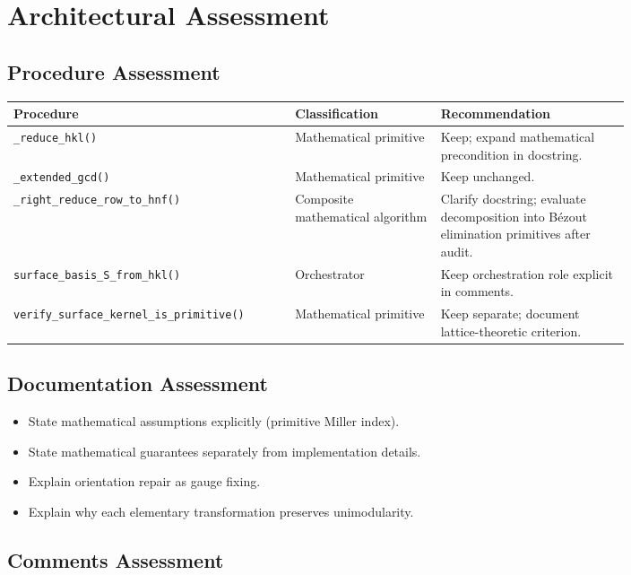
\section{Architectural Assessment}

\subsection{Procedure Assessment}

\begin{center}
\begin{tabular}{|p{0.34\linewidth}|p{0.2\linewidth}|p{0.26\linewidth}|}
\hline
Procedure & Classification & Recommendation\\
\hline
\texttt{\_reduce\_hkl()} & Mathematical primitive & Keep; expand mathematical precondition in docstring.\\
\hline
\texttt{\_extended\_gcd()} & Mathematical primitive & Keep unchanged.\\
\hline
\texttt{\_right\_reduce\_row\_to\_hnf()} & Composite mathematical algorithm & Clarify docstring; evaluate decomposition into Bézout elimination primitives after audit.\\
\hline
\texttt{surface\_basis\_S\_from\_hkl()} & Orchestrator & Keep orchestration role explicit in comments.\\
\hline
\texttt{verify\_surface\_kernel\_is\_primitive()} & Mathematical primitive & Keep separate; document lattice-theoretic criterion.\\
\hline
\end{tabular}
\end{center}

\subsection{Documentation Assessment}

\begin{itemize}
\item State mathematical assumptions explicitly (primitive Miller index).
\item State mathematical guarantees separately from implementation details.
\item Explain orientation repair as gauge fixing.
\item Explain why each elementary transformation preserves unimodularity.
\end{itemize}

\subsection{Comments Assessment}

